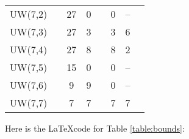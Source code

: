 \begin{singlespace}
\begin{table}[H]
\begin{tabular}{@{}cccllccc@{}}
 UW(7,2)       && 27             & 0  && 0  & -- \\
 UW(7,3)       && 27             & 3  && 3  &  6  \\
 UW(7,4)       && 27             & 8  && 8  &  2  \\
 UW(7,5)       && 15             & 0  && 0  & -- \\
 \rowcolor{Gray}
 UW(7,6)       && 9              & 9  && 0  &  --   \\
 UW(7,7)       && 7              & 7  && 7  &  7  \\
 \bottomrule
\end{tabular}
\end{table}
\end{singlespace}

\pagebreak
Here is the \LaTeX code for Table \ref{table:bounds}:

